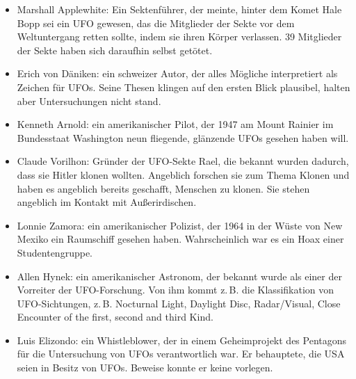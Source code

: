 \documentclass{scrartcl}
\begin{document}
\begin{itemize}
	\item Marshall Applewhite: Ein Sektenführer, der meinte, hinter dem Komet Hale Bopp sei ein UFO gewesen, das die Mitglieder der Sekte vor dem Weltuntergang retten sollte, indem sie \frq ihren Körper verlassen\flq. 39 Mitglieder der Sekte haben sich daraufhin selbst getötet.
	\item Erich von Däniken: ein schweizer Autor, der alles Mögliche interpretiert als Zeichen für UFOs. Seine Thesen klingen auf den ersten Blick plausibel, halten aber Untersuchungen nicht stand.
	\item Kenneth Arnold: ein amerikanischer Pilot, der 1947 am Mount Rainier im Bundesstaat Washington neun fliegende, glänzende UFOs gesehen haben will.
	\item Claude Vorilhon: Gründer der UFO-Sekte \frqq Rael\flqq, die bekannt wurden dadurch, dass sie Hitler klonen wollten. Angeblich forschen sie zum Thema Klonen und haben es angeblich bereits geschafft, Menschen zu klonen. Sie stehen angeblich im Kontakt mit Außerirdischen.
	\item Lonnie Zamora: ein amerikanischer Polizist, der 1964 in der Wüste von New Mexiko ein Raumschiff gesehen haben. Wahrscheinlich war es ein Hoax einer Studentengruppe.
	\item Allen Hynek: ein amerikanischer Astronom, der bekannt wurde als einer der Vorreiter der UFO-Forschung. Von ihm kommt z.\,B. die Klassifikation von UFO-Sichtungen, z.\,B. Nocturnal Light, Daylight Disc, Radar/Visual, Close Encounter of the first, second and third Kind.
	\item Luis Elizondo: ein Whistleblower, der in einem Geheimprojekt des Pentagons für die Untersuchung von UFOs verantwortlich war. Er behauptete, die USA seien in Besitz von UFOs. Beweise konnte er keine vorlegen.


\end{itemize}
\end{document}
